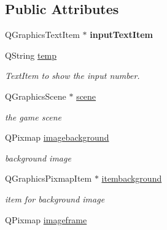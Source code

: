\subsection*{\-Public \-Attributes}
\begin{DoxyCompactItemize}
\item 
\hypertarget{classgamemanager3_a5524cc3853e7d896f55e1bb7c86f65bc}{\-Q\-Graphics\-Text\-Item $\ast$ {\bfseries input\-Text\-Item}}\label{classgamemanager3_a5524cc3853e7d896f55e1bb7c86f65bc}

\item 
\-Q\-String \hyperlink{classgamemanager3_aa55b0fc7751e1d5cae7e09bc52a8d6e0}{temp}
\begin{DoxyCompactList}\small\item\em \-Text\-Item to show the input number. \end{DoxyCompactList}\item 
\hypertarget{classgamemanager3_a3de0a0584a1cb35d7b1e29f0db98e7e9}{\-Q\-Graphics\-Scene $\ast$ \hyperlink{classgamemanager3_a3de0a0584a1cb35d7b1e29f0db98e7e9}{scene}}\label{classgamemanager3_a3de0a0584a1cb35d7b1e29f0db98e7e9}

\begin{DoxyCompactList}\small\item\em the game scene \end{DoxyCompactList}\item 
\hypertarget{classgamemanager3_aeb8915edd26bdd651ec4d9d17091fa41}{\-Q\-Pixmap \hyperlink{classgamemanager3_aeb8915edd26bdd651ec4d9d17091fa41}{imagebackground}}\label{classgamemanager3_aeb8915edd26bdd651ec4d9d17091fa41}

\begin{DoxyCompactList}\small\item\em background image \end{DoxyCompactList}\item 
\hypertarget{classgamemanager3_a3712903a4782fe8ea5340fe2ec5fe583}{\-Q\-Graphics\-Pixmap\-Item $\ast$ \hyperlink{classgamemanager3_a3712903a4782fe8ea5340fe2ec5fe583}{itembackground}}\label{classgamemanager3_a3712903a4782fe8ea5340fe2ec5fe583}

\begin{DoxyCompactList}\small\item\em item for background image \end{DoxyCompactList}\item 
\hypertarget{classgamemanager3_ac2ffab31513bfd9472c7d0991c491f19}{\-Q\-Pixmap \hyperlink{classgamemanager3_ac2ffab31513bfd9472c7d0991c491f19}{imageframe}}\label{classgamemanager3_ac2ffab31513bfd9472c7d0991c491f19}


\end{DoxyCompactItemize}
